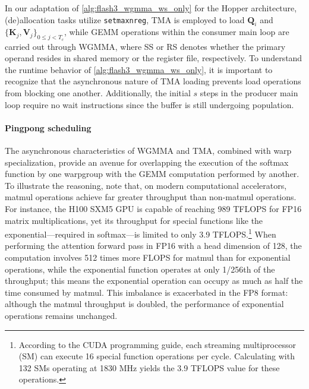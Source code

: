 In our adaptation of \cref{alg:flash3_wgmma_ws_only} for the Hopper architecture, (de)allocation tasks utilize \verb|setmaxnreg|, TMA is employed to load $\mathbf{Q}_i$ and $\{ \mathbf{K}_j, \mathbf{V}_j \}_{0 \leq j < T_c}$, while GEMM operations within the consumer main loop are carried out through WGMMA, where SS or RS denotes whether the primary operand resides in shared memory or the register file, respectively. To understand the runtime behavior of \cref{alg:flash3_wgmma_ws_only}, it is important to recognize that the asynchronous nature of TMA loading prevents load operations from blocking one another. Additionally, the initial $s$ steps in the producer main loop require no wait instructions since the buffer is still undergoing population.

\paragraph{Pingpong scheduling} The asynchronous characteristics of WGMMA and TMA, combined with warp specialization, provide an avenue for overlapping the execution of the softmax function by one warpgroup with the GEMM computation performed by another. To illustrate the reasoning, note that, on modern computational accelerators, matmul operations achieve far greater throughput than non-matmul operations. For instance, the H100 SXM5 GPU is capable of reaching 989 TFLOPS for FP16 matrix multiplications, yet its throughput for special functions like the exponential—required in softmax—is limited to only 3.9 TFLOPS.\footnote{According to the CUDA programming guide, each streaming multiprocessor (SM) can execute 16 special function operations per cycle. Calculating with 132 SMs operating at 1830 MHz yields the 3.9 TFLOPS value for these operations.} When performing the attention forward pass in FP16 with a head dimension of 128, the computation involves 512 times more FLOPS for matmul than for exponential operations, while the exponential function operates at only 1/256th of the throughput; this means the exponential operation can occupy as much as half the time consumed by matmul. This imbalance is exacerbated in the FP8 format: although the matmul throughput is doubled, the performance of exponential operations remains unchanged.

